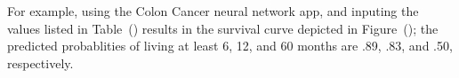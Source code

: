 \documentclass[10pt,letterpaper]{article}
\begin{document}
 For example, using the Colon Cancer neural network app, and 
inputing the values listed in Table~() results in the survival curve depicted in Figure~(); the predicted probablities of living 
at least 6, 12, and 60 months are .89, .83, and .50, respectively.





\end{document}
